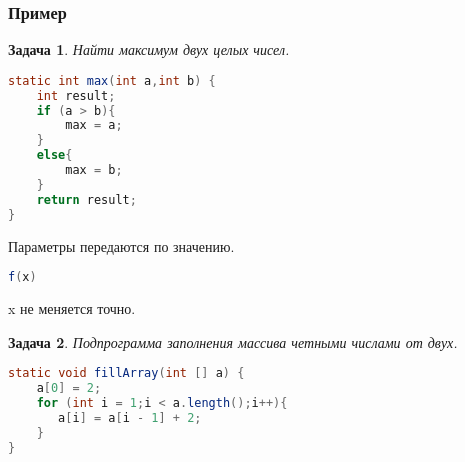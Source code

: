 \documentclass{article}
\newtheorem{task}{Задача}
\begin{document}
\subsubsection{Пример}
\begin{task}
    Найти максимум двух целых чисел.
\end{task}
\begin{lstlisting}[language=Java] 
static int max(int a,int b) {
    int result;
    if (a > b){
        max = a;
    }
    else{
        max = b;
    }
    return result;
}
\end{lstlisting} 
Параметры передаются по значению.
\begin{lstlisting}[language=Java] 
f(x) 
\end{lstlisting}
x не меняется точно.
\begin{task}
    Подпрограмма заполнения массива четными числами от двух.
\end{task}
\begin{lstlisting}[language=Java] 
static void fillArray(int [] a) {
    a[0] = 2;
    for (int i = 1;i < a.length();i++){
       a[i] = a[i - 1] + 2;
    }
}
\end{lstlisting} 
\end{document}
